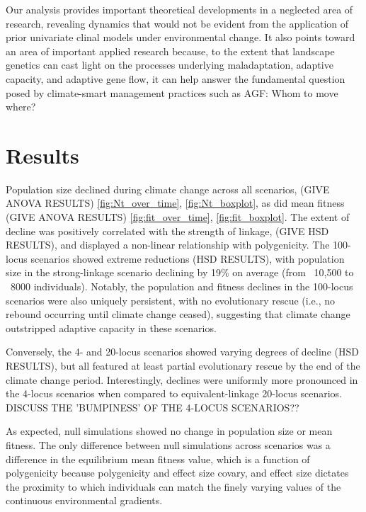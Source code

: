 \documentclass[9pt,twocolumn,twoside,lineno]{pnas-new}
\begin{document}
Our analysis provides important theoretical developments
in a neglected area of research,
revealing dynamics that would not be evident from the application
of prior univariate clinal models under environmental change.
It also points toward an area 
of important applied research because, to the extent that landscape genetics can cast 
light on the processes underlying maladaptation, adaptive capacity, and adaptive gene
flow, it can help answer the fundamental question posed by climate-smart management 
practices such as AGF: Whom to move where?


\section*{Results}

Population size declined during climate change across all scenarios, (GIVE ANOVA 
RESULTS) \ref{fig:Nt_over_time}, \ref{fig:Nt_boxplot}, as did mean fitness (GIVE ANOVA 
RESULTS) \ref{fig:fit_over_time}, \ref{fig:fit_boxplot}. The extent of decline was 
positively correlated with the strength of linkage, (GIVE HSD RESULTS), and 
displayed a non-linear relationship with polygenicity. The 100-locus scenarios showed 
extreme reductions (HSD RESULTS), with population size in the strong-linkage scenario
declining by 19\% on average (from ~10,500 to ~8000 individuals).
Notably, the population and fitness declines in the 100-locus scenarios
were also uniquely persistent, with no evolutionary rescue (i.e., no rebound occurring until climate change ceased), 
suggesting that climate change outstripped adaptive capacity in these scenarios.

Conversely, the 4- and 20-locus scenarios showed varying degrees
of decline (HSD RESULTS),
but all featured at least partial evolutionary rescue by the end of the climate change period.
Interestingly, declines were uniformly more pronounced in the 4-locus scenarios
when compared to equivalent-linkage 20-locus scenarios. DISCUSS THE 'BUMPINESS' OF THE 4-LOCUS SCENARIOS?? 
 
As expected, null simulations showed no change in population size or mean fitness. The only difference between null simulations across scenarios was a difference in the 
equilibrium mean fitness value, which is a function of polygenicity because polygenicity 
and effect size covary, and effect size dictates the proximity to which individuals can 
match the finely varying values of the continuous environmental gradients.
\end{document}
